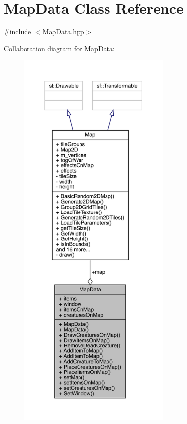 \hypertarget{class_map_data}{}\section{Map\+Data Class Reference}
\label{class_map_data}


{\ttfamily \#include $<$Map\+Data.\+hpp$>$}



Collaboration diagram for Map\+Data\+:
\nopagebreak
\begin{figure}[H]
\begin{center}
\leavevmode
\includegraphics[height=550pt]{dd/dfc/class_map_data__coll__graph}
\end{center}
\end{figure}
